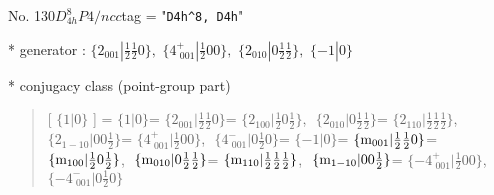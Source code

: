 \documentclass[fleqn,10pt,landscape]{jsarticle}
\begin{document}
\newpage

No. 130\quad$D_{4h}^{8}$\quad$P4/ncc$\quad[ tetragonal ]
tag = "{\tt D4h^8, D4h}"

* generator : $\{2{}_{001}|\frac{1}{2} \frac{1}{2} 0\},\,\,\{4^{+}_{\,\,001}|\frac{1}{2} 0 0\},\,\,\{2{}_{010}|0 \frac{1}{2} \frac{1}{2}\},\,\,\{-1|0\}$

* conjugacy class (point-group part)
\begin{quote}
[ $\{1|0\}$ ] = \quad $\{1|0\}$ = \quad $\{2{}_{001}|\frac{1}{2} \frac{1}{2} 0\}$ = \quad $\{2{}_{100}|\frac{1}{2} 0 \frac{1}{2}\}$,\,\, $\{2{}_{010}|0 \frac{1}{2} \frac{1}{2}\}$ = \quad $\{2{}_{110}|\frac{1}{2} \frac{1}{2} \frac{1}{2}\}$,\,\, $\{2{}_{1-10}|0 0 \frac{1}{2}\}$\newline[ $\{4^{+}_{\,\,001}|\frac{1}{2} 0 0\}$ ] = \quad $\{4^{+}_{\,\,001}|\frac{1}{2} 0 0\}$,\,\, $\{4^{-}_{\,\,001}|0 \frac{1}{2} 0\}$\newline[ $\{-1|0\}$ ] = \quad $\{-1|0\}$ = \quad $\{{\rm m}_{001}|\frac{1}{2} \frac{1}{2} 0\}$ = \quad $\{{\rm m}_{100}|\frac{1}{2} 0 \frac{1}{2}\}$,\,\, $\{{\rm m}_{010}|0 \frac{1}{2} \frac{1}{2}\}$ = \quad $\{{\rm m}_{110}|\frac{1}{2} \frac{1}{2} \frac{1}{2}\}$,\,\, $\{{\rm m}_{1-10}|0 0 \frac{1}{2}\}$\newline[ $\{-4^{+}_{\,\,001}|\frac{1}{2} 0 0\}$ ] = \quad $\{-4^{+}_{\,\,001}|\frac{1}{2} 0 0\}$,\,\, $\{-4^{-}_{\,\,001}|0 \frac{1}{2} 0\}$\newline
\end{quote}
\end{document}

